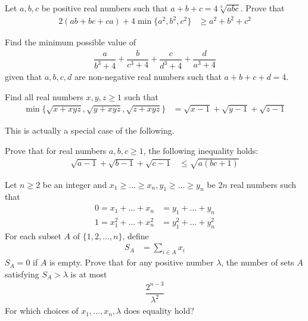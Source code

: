 \documentclass{subfile}
\begin{document}
		\begin{problem}
			Let $a,b,c$ be positive real numbers such that $a+b+c=4\sqrt[3]{abc}$. Prove that
				\begin{align*}
					2(ab+bc+ca)+4\min\{a^{2},b^{2},c^{2}\}
						& \geq a^{2}+b^{2}+c^{2}
				\end{align*}
		\end{problem}
	
		\begin{problem}
			Find the minimum possible value of
				\begin{align*}
					\dfrac{a}{b^{3}+4}+\dfrac{b}{c^{3}+4}+\dfrac{c}{d^{3}+4}+\dfrac{d}{a^{3}+4}
				\end{align*}
			given that $a,b,c,d$ are non-negative real numbers such that $a+b+c+d=4$.
		\end{problem}
	
		\begin{problem}
			Find all real numbers $x,y,z\ge1$ such that
				\begin{align*}
					\min\{\sqrt{x+xyz},\sqrt{y+xyz},\sqrt{z+xyz}\}
						& = \sqrt{x-1}+\sqrt{y-1}+\sqrt{z-1}
				\end{align*}
		\end{problem}
	This is actually a special case of the following.
		\begin{problem}
			Prove that for real numbers $a,b,c\geq1$, the following inequality holds:
				\begin{align*}
					\sqrt{a-1}+\sqrt{b-1}+\sqrt{c-1}
						& \leq\sqrt{a(bc+1)}
				\end{align*}
		\end{problem}
	
		\begin{problem}
			Let $n\geq2$ be an integer and $x_{1}\geq\ldots\geq x_{n},y_{1}\geq\ldots\geq y_{n}$ be $2n$ real numbers such that
				\begin{align*}
					0 = x_{1}+\ldots+x_{n}
						& = y_{1}+\ldots+y_{n}\\
					1 = x_{1}^{2}+\ldots+x_{n}^{2}
						& = y_{1}^{2}+\ldots+y_{n}^{2}
				\end{align*}
			For each subset $A$ of $\{1,2,\ldots,n\}$, define
				\begin{align*}
					S_{A}
						& = \sum_{i\in A}x_{i}
				\end{align*}
			$S_{A}=0$ if $A$ is empty. Prove that for any positive number $\lambda$, the number of sets $A$ satisfying $S_{A}>\lambda$ is at most
				\begin{align*}
					\dfrac{2^{n-3}}{\lambda^{2}}
				\end{align*}
			For which choices of $x_{1},\ldots,x_{n},\lambda$ does equality hold?
		\end{problem}
	
\end{document}
